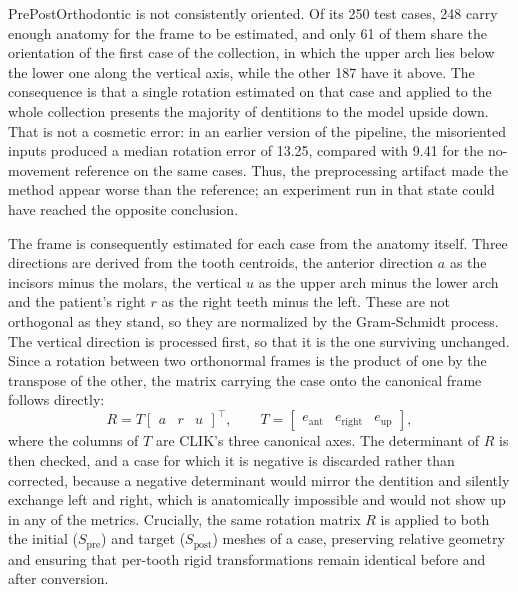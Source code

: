 \documentclass[10pt,a4paper]{article}
\begin{document}
PrePostOrthodontic is not consistently oriented. Of its 250 test cases, 248 carry enough anatomy for the frame to be estimated, and only 61 of them share the orientation of the first case of the collection, in which the upper arch lies below the lower one along the vertical axis, while the other 187 have it above. The consequence is that a single rotation estimated on that case and applied to the whole collection presents the majority of dentitions to the model upside down. That is not a cosmetic error: in an earlier version of the pipeline, the misoriented inputs produced a median rotation error of 13.25\degree{}, compared with 9.41\degree{} for the no-movement reference on the same cases. Thus, the preprocessing artifact made the method appear worse than the reference; an experiment run in that state could have reached the opposite conclusion.

The frame is consequently estimated for each case from the anatomy itself. Three directions are derived from the tooth centroids, the anterior direction $a$ as the incisors minus the molars, the vertical $u$ as the upper arch minus the lower arch and the patient's right $r$ as the right teeth minus the left. These are not orthogonal as they stand, so they are normalized by the Gram-Schmidt process. The vertical direction is processed first, so that it is the one surviving unchanged. Since a rotation between two orthonormal frames is the product of one by the transpose of the other, the matrix carrying the case onto the canonical frame follows directly:
\begin{equation}
R = T \begin{bmatrix} a & r & u \end{bmatrix}^{\top},
\qquad T = \begin{bmatrix} e_{\text{ant}} & e_{\text{right}} & e_{\text{up}} \end{bmatrix},
\end{equation}
where the columns of $T$ are CLIK's three canonical axes. The determinant of $R$ is then checked, and a case for which it is negative is discarded rather than corrected, because a negative determinant would mirror the dentition and silently exchange left and right, which is anatomically impossible and would not show up in any of the metrics. Crucially, the same rotation matrix $R$ is applied to both the initial ($S_{\text{pre}}$) and target ($S_{\text{post}}$) meshes of a case, preserving relative geometry and ensuring that per-tooth rigid transformations remain identical before and after conversion.
\end{document}
